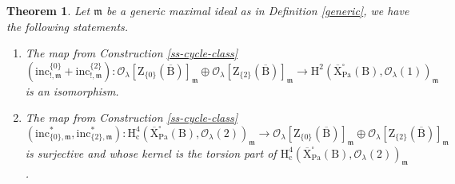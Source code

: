 \documentclass[10pt]{amsart}
\numberwithin{equation}{section}
\newtheorem{theorem}[equation]{Theorem}
\theoremstyle{definition}
\def\Pa{\mathrm{Pa}}
\def\calO{\mathcal{O}}
\def\fracm{\mathfrak{m}}
\def\rmc{\mathrm{c}}
\def\rmB{\mathrm{B}}
\def\rmH{\mathrm{H}}
\def\rmX{\mathrm{X}}
\def\rmZ{\mathrm{Z}}
\begin{document}
\begin{theorem}\label{Tate}
Let $\fracm$ be a generic maximal ideal as in Definition \ref{generic}, we have the following statements.
\begin{enumerate}
\item The map from Construction \ref{ss-cycle-class}
\begin{equation*}
(\mathrm{inc}^{\{0\}}_{!, \fracm}+\mathrm{inc}^{\{2\}}_{!, \fracm}):\calO_{\lambda}[\rmZ_{\{0\}}(\overline{\rmB})]_{\fracm}\oplus\calO_{\lambda}[\rmZ_{\{2\}}(\overline{\rmB})]_{\fracm} \rightarrow  \rmH^{2}(\overline{\rmX}^{\square}_{\Pa}(\rmB), \calO_{\lambda}(1))_{\fracm}
\end{equation*}
is an isomorphism.
\item The map from Construction \ref{ss-cycle-class}
\begin{equation*}
(\mathrm{inc}^{\ast}_{\{0\}, \fracm}, \mathrm{inc}^{\ast}_{\{2\}, \fracm}): \rmH^{4}_{\rmc}(\overline{\rmX}^{\square}_{\Pa}(\rmB), \calO_{\lambda}(2))_{\fracm}\rightarrow \calO_{\lambda}[\rmZ_{\{0\}}(\overline{\rmB})]_{\fracm}\oplus\calO_{\lambda}[\rmZ_{\{2\}}(\overline{\rmB})]_{\fracm} 
\end{equation*}
is surjective and whose kernel is the torsion part of $\rmH^{4}_{\rmc}(\overline{\rmX}^{\square}_{\Pa}(\rmB), \calO_{\lambda}(2))_{\fracm}$.
\end{enumerate}
\end{theorem}
\end{document}
